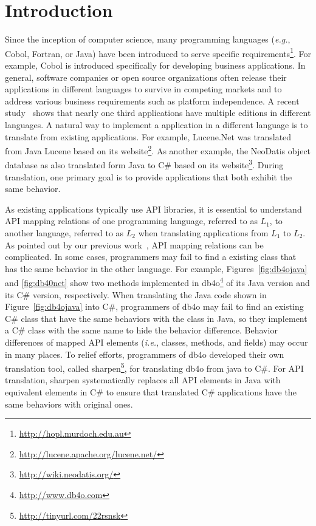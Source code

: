 \section{Introduction}
\label{sec:introduction}

Since the inception of computer science, many programming languages (\emph{e.g.}, Cobol, Fortran, or Java) have been introduced to serve specific requirements\footnote{\url{http://hopl.murdoch.edu.au}}. For example, Cobol is introduced specifically for developing business applications. In general, software companies or open source organizations often release their applications in different languages to survive in competing markets and to address various business requirements such as platform independence. A recent study~\cite{jones1998estimating} shows that nearly one third applications have multiple editions in different languages. A natural way to implement a application in a different language is to translate from existing applications. For example, Lucene.Net was translated from Java Lucene based on its website\footnote{\url{http://lucene.apache.org/lucene.net/}}. As another example, the NeoDatis object database as also translated form Java to C\# based on its website\footnote{\url{http://wiki.neodatis.org/}}. During translation, one primary goal is to provide applications that both exhibit the same behavior.


As existing applications typically use API libraries, it is essential to understand API mapping relations of one programming language, referred to as $L_1$, to another language, referred to as $L_2$ when translating applications from $L_1$ to $L_2$. As pointed out by our previous work~\cite{zhong2010mining}, API mapping relations can be complicated. In some cases, programmers may fail to find a existing class that has the same behavior in the other language. For example, Figures~\ref{fig:db4ojava} and \ref{fig:db40net} show two methods implemented in db4o\footnote{\url{http://www.db4o.com}} of its Java version and its C\# version, respectively. When translating the Java code shown in Figure~\ref{fig:db4ojava} into C\#, programmers of db4o may fail to find an existing C\# class that have the same behaviors with the  class in Java, so they implement a C\# class with the same name to hide the behavior difference. Behavior differences of mapped API elements (\emph{i.e.}, classes, methods, and fields) may occur in many places. To relief efforts, programmers of db4o developed their own translation tool, called sharpen\footnote{\url{http://tinyurl.com/22rsnsk}}, for translating db4o from java to C\#. For API translation, sharpen systematically replaces all API elements in Java with equivalent elements in C\# to ensure that translated C\# applications have the same behaviors with original ones.


